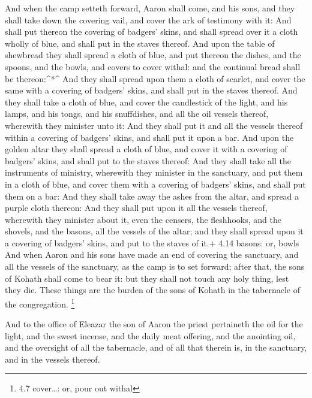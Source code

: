  And when the camp setteth forward, Aaron shall come, and
his sons, and they shall take down the covering vail, and cover the ark
of testimony with it:  And shall put thereon the covering of
badgers' skins, and shall spread over it a cloth wholly of blue, and
shall put in the staves thereof.  And upon the table of
shewbread they shall spread a cloth of blue, and put thereon the dishes,
and the spoons, and the bowls, and covers to cover withal: and the
continual bread shall be thereon:\^{}*\^{}  And they shall
spread upon them a cloth of scarlet, and cover the same with a covering
of badgers' skins, and shall put in the staves thereof.  And
they shall take a cloth of blue, and cover the candlestick of the light,
and his lamps, and his tongs, and his snuffdishes, and all the oil
vessels thereof, wherewith they minister unto it:  And they
shall put it and all the vessels thereof within a covering of badgers'
skins, and shall put it upon a bar.  And upon the golden
altar they shall spread a cloth of blue, and cover it with a covering of
badgers' skins, and shall put to the staves thereof:  And
they shall take all the instruments of ministry, wherewith they minister
in the sanctuary, and put them in a cloth of blue, and cover them with a
covering of badgers' skins, and shall put them on a bar: 
And they shall take away the ashes from the altar, and spread a purple
cloth thereon:  And they shall put upon it all the vessels
thereof, wherewith they minister about it, even the censers, the
fleshhooks, and the shovels, and the basons, all the vessels of the
altar; and they shall spread upon it a covering of badgers' skins, and
put to the staves of it.+ 4.14 basons: or, bowls  And when
Aaron and his sons have made an end of covering the sanctuary, and all
the vessels of the sanctuary, as the camp is to set forward; after that,
the sons of Kohath shall come to bear it: but they shall not touch any
holy thing, lest they die. These things are the burden of the sons of
Kohath in the tabernacle of the congregation. \footnote{4.7 cover\ldots:
  or, pour out withal}

 And to the office of Eleazar the son of Aaron the priest
pertaineth the oil for the light, and the sweet incense, and the daily
meat offering, and the anointing oil, and the oversight of all the
tabernacle, and of all that therein is, in the sanctuary, and in the
vessels thereof.

